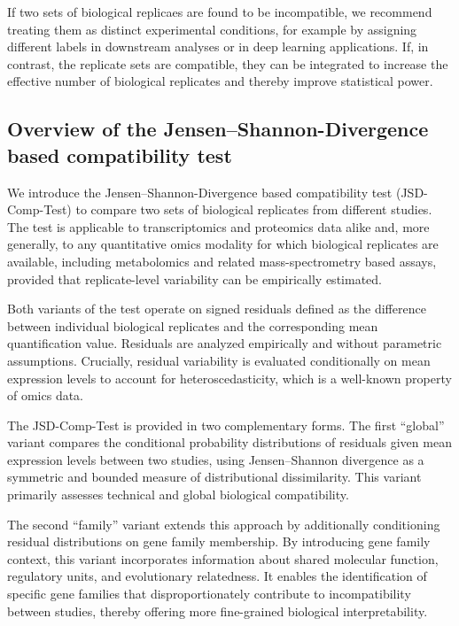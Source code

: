 If two sets of biological replicaes are found to be incompatible, we recommend treating them as distinct experimental conditions, for example by assigning different labels in downstream analyses or in deep learning applications. If, in contrast, the replicate sets are compatible, they can be integrated to increase the effective number of biological replicates and thereby improve statistical power.

\subsection{Overview of the Jensen--Shannon-Divergence based compatibility test}

We introduce the Jensen--Shannon-Divergence based compatibility test (JSD-Comp-Test) to compare two sets of biological replicates from different studies. The test is applicable to transcriptomics and proteomics data alike and, more generally, to any quantitative omics modality for which biological replicates are available, including metabolomics and related mass-spectrometry based assays, provided that replicate-level variability can be empirically estimated.

Both variants of the test operate on signed residuals defined as the difference between individual biological replicates and the corresponding mean quantification value. Residuals are analyzed empirically and without parametric assumptions. Crucially, residual variability is evaluated conditionally on mean expression levels to account for heteroscedasticity, which is a well-known property of omics data.

The JSD-Comp-Test is provided in two complementary forms. The first ``global'' variant compares the conditional probability distributions of residuals given mean expression levels between two studies, using Jensen--Shannon divergence as a symmetric and bounded measure of distributional dissimilarity. This variant primarily assesses technical and global biological compatibility.

The second ``family'' variant extends this approach by additionally conditioning residual distributions on gene family membership. By introducing gene family context, this variant incorporates information about shared molecular function, regulatory units, and evolutionary relatedness. It enables the identification of specific gene families that disproportionately contribute to incompatibility between studies, thereby offering more fine-grained biological interpretability.

